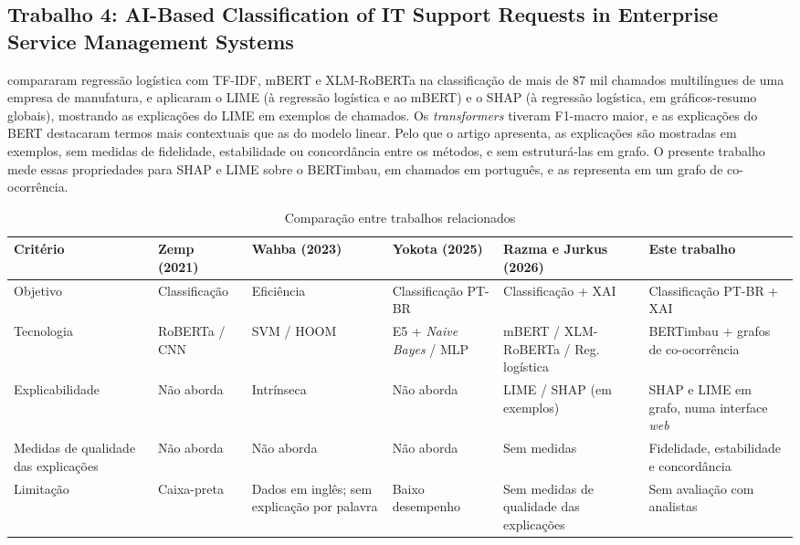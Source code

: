 \documentclass[
    12pt,                %
    openright,           %
    oneside,             %
    a4paper,             %
    english,             %
    brazil               %
]{abntex2}
\let\legendoriginal\legend
\renewcommand{\legend}[1]{\legendoriginal{\small #1}}
\begin{document}
\subsection{Trabalho 4: AI-Based Classification of IT Support Requests in Enterprise Service Management Systems}

 compararam regressão logística com TF-IDF, mBERT e XLM-RoBERTa na classificação de mais de 87 mil chamados multilíngues de uma empresa de manufatura, e aplicaram o LIME (à regressão logística e ao mBERT) e o SHAP (à regressão logística, em gráficos-resumo globais), mostrando as explicações do LIME em exemplos de chamados. Os \textit{transformers} tiveram F1-macro maior, e as explicações do BERT destacaram termos mais contextuais que as do modelo linear. Pelo que o artigo apresenta, as explicações são mostradas em exemplos, sem medidas de fidelidade, estabilidade ou concordância entre os métodos, e sem estruturá-las em grafo. O presente trabalho mede essas propriedades para SHAP e LIME sobre o BERTimbau, em chamados em português, e as representa em um grafo de co-ocorrência.

\vspace{0.5cm}

\begin{table}[htb]
    \centering
    \caption{Comparação entre trabalhos relacionados}
    \label{tab:trabalhos_relacionados}
    \footnotesize
    \begin{tabular}{>{\raggedright\arraybackslash}p{2.3cm}|>{\centering\arraybackslash}p{2.0cm}|>{\centering\arraybackslash}p{2.1cm}|>{\centering\arraybackslash}p{2.0cm}|>{\centering\arraybackslash}p{2.3cm}|>{\centering\arraybackslash}p{2.7cm}}
        \toprule
        \textbf{Critério} & \textbf{Zemp (2021)} & \textbf{Wahba (2023)} & 
        \textbf{Yokota (2025)} & \textbf{Razma e Jurkus (2026)} & \textbf{Este trabalho} \\
        \midrule
        Objetivo & Classificação & Eficiência & Classificação PT-BR & 
        Classificação + XAI & Classificação PT-BR + XAI \\
        \midrule
        Tecnologia & RoBERTa / CNN & SVM / HOOM & E5 + \textit{Naive Bayes} / MLP & 
        mBERT / XLM-RoBERTa / Reg. logística & BERTimbau + grafos de co-ocorrência \\
        \midrule
        Explicabilidade & Não aborda & Intrínseca & Não aborda & LIME / SHAP (em exemplos) & SHAP e LIME em grafo, numa interface \textit{web} \\
        \midrule
        Medidas de qualidade das explicações & Não aborda & Não aborda & Não aborda & Sem medidas & Fidelidade, estabilidade e concordância \\
        \midrule
        Limitação & Caixa-preta & Dados em inglês; sem explicação por palavra & Baixo desempenho & 
        Sem medidas de qualidade das explicações & Sem avaliação com analistas \\
        \bottomrule
    \end{tabular}
    \vspace{0.2cm}
    \legend{Fonte: Elaborado pelos autores.}
\end{table}
\end{document}
